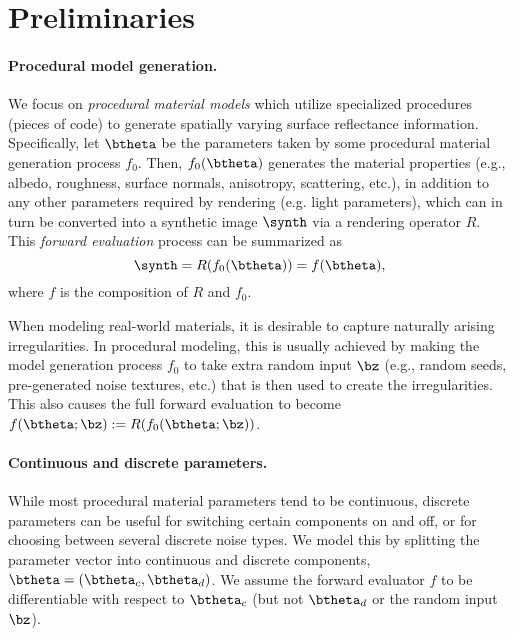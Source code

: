 \section{Preliminaries}
\label{sec:prelim}

\paragraph*{Procedural model generation.}
We focus on \emph{procedural material models} which utilize specialized %
procedures (pieces of code) to generate spatially varying surface reflectance information.
Specifically, let $\btheta$ be the parameters taken by some procedural material generation process $f_0$.
Then, $f_0(\btheta)$ generates the material properties (e.g., albedo, roughness, surface normals, anisotropy, scattering, etc.), in addition to any other parameters required by rendering (e.g. light parameters), which can in turn be converted into a synthetic image $\synth$ via a rendering operator $R$.
This \emph{forward evaluation} process can be summarized as
%
\begin{equation}
	\label{eq:forward}
	\synth = R(f_0(\btheta)) = f(\btheta),
\end{equation}
%
where $f$ is the composition of $R$ and $f_0$.

When modeling real-world materials, it is desirable to capture naturally arising irregularities.
In procedural modeling, this is usually achieved by making the model generation process $f_0$ to take extra random input $\bz$ (e.g., random seeds, pre-generated noise textures, etc.) that is then used to create the irregularities.
This also causes the full forward evaluation to become $f(\btheta; \bz) := R(f_0(\btheta; \bz))$.

\paragraph*{Continuous and discrete parameters.}
While most procedural material parameters tend to be continuous, discrete parameters can be useful for switching certain components on and off, or for choosing between several discrete noise types. We model this by splitting the parameter vector into continuous and discrete components, $\btheta = (\btheta_c, \btheta_d)$.
We assume the forward evaluator $f$ to be differentiable with respect to $\btheta_c$ (but not $\btheta_d$ or the random input $\bz$).


